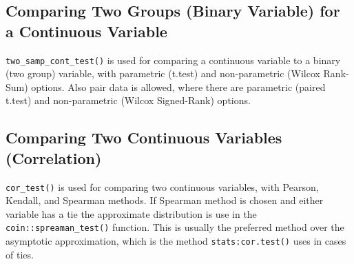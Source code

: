 \documentclass[table]{article}
\newenvironment{Shaded}{\begin{snugshade}}{\end{snugshade}}
\newcommand{\CommentTok}[1]{\textcolor[rgb]{0.56,0.35,0.01}{\textit{#1}}}
\newcommand{\DataTypeTok}[1]{\textcolor[rgb]{0.13,0.29,0.53}{#1}}
\newcommand{\KeywordTok}[1]{\textcolor[rgb]{0.13,0.29,0.53}{\textbf{#1}}}
\newcommand{\NormalTok}[1]{#1}
\newcommand{\OperatorTok}[1]{\textcolor[rgb]{0.81,0.36,0.00}{\textbf{#1}}}
\newcommand{\StringTok}[1]{\textcolor[rgb]{0.31,0.60,0.02}{#1}}
\begin{document}
\hypertarget{comparing-two-groups-binary-variable-for-a-continuous-variable}{%
\subsection{Comparing Two Groups (Binary Variable) for a Continuous
Variable}\label{comparing-two-groups-binary-variable-for-a-continuous-variable}}

\texttt{two\_samp\_cont\_test()} is used for comparing a continuous
variable to a binary (two group) variable, with parametric (t.test) and
non-parametric (Wilcox Rank-Sum) options. Also pair data is allowed,
where there are parametric (paired t.test) and non-parametric (Wilcox
Signed-Rank) options.

\begin{Shaded}
\end{Shaded}

\hypertarget{comparing-two-continuous-variables-correlation}{%
\subsection{Comparing Two Continuous Variables
(Correlation)}\label{comparing-two-continuous-variables-correlation}}

\texttt{cor\_test()} is used for comparing two continuous variables,
with Pearson, Kendall, and Spearman methods. If Spearman method is
chosen and either variable has a tie the approximate distribution is use
in the \texttt{coin::spreaman\_test()} function. This is usually the
preferred method over the asymptotic approximation, which is the method
\texttt{stats:cor.test()} uses in cases of ties.
\end{document}
